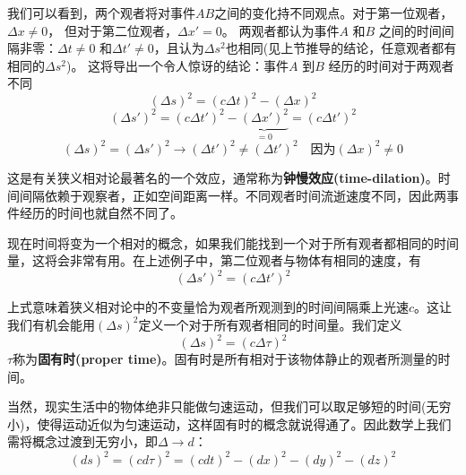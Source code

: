 我们可以看到，两个观者将对事件$AB$之间的变化持不同观点。对于第一位观者，$\Delta x \neq 0$， 但对于第二位观者，$\Delta x' = 0$。 两观者都认为事件$A$ 和$B$ 之间的时间间隔非零：$\Delta t \neq 0$ 和$\Delta t' \neq 0$，且认为$\Delta s^2$也相同(见上节推导的结论，任意观者都有相同的$\Delta s^2$)。 这将导出一个令人惊讶的结论：事件$A$ 到$B$ 经历的时间对于两观者不同
\begin{equation}\label{eq2.14}
  (\Delta s)^2
  =(c\Delta t)^2
  -(\Delta x)^2
\end{equation}
\begin{equation}\label{eq2.15}
  (\Delta s')^2
  =(c\Delta t')^2
  -\underbrace{(\Delta x')^2}_{=0}
  =(c\Delta t')^2
\end{equation}
\begin{equation}\label{eq2.16}
   (\Delta s)^2
   = (\Delta s')^2
   \rightarrow
    (\Delta t')^2 \neq
     (\Delta t')^2
     \quad \text{因为}  (\Delta x)^2 \neq 0
\end{equation}

这是有关狭义相对论最著名的一个效应，通常称为{\bf{钟慢效应(time-dilation)}}。时间间隔依赖于观察者，正如空间距离一样。不同观者时间流逝速度不同，因此两事件经历的时间也就自然不同了。

现在时间将变为一个相对的概念，如果我们能找到一个对于所有观者都相同的时间量，这将会非常有用。在上述例子中，第二位观者与物体有相同的速度，有
\begin{equation}\label{eq2.17}
  (\Delta s')^2
  =(c\Delta t')^2
\end{equation}

上式意味着狭义相对论中的不变量恰为观者所观测到的时间间隔乘上光速$c$。这让我们有机会能用$(\Delta s)^2$定义一个对于所有观者相同的时间量。我们定义
\begin{equation}\label{eq2.18}
  (\Delta s)^2
  =(c\Delta \tau)^2
\end{equation}
$\tau$称为{\bf{固有时(proper time)}}。固有时是所有相对于该物体静止的观者所测量的时间。

当然，现实生活中的物体绝非只能做匀速运动，但我们可以取足够短的时间(无穷小)，使得运动近似为匀速运动，这样固有时的概念就说得通了。因此数学上我们需将概念过渡到无穷小，即$\Delta \rightarrow d$：
\begin{equation}\label{eq2.19}
  (ds)^2  =(cd \tau )^2=(cdt)^2-(dx)^2-(dy)^2-(dz)^2
\end{equation}


